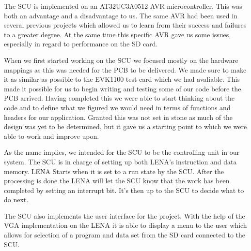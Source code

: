 The \acf{SCU} is implemented on an AT32UC3A0512 AVR microcontroller. This was both an advantage and a disadvantage to us. The same AVR had been used in several previous projects which allowed us to learn from their success and failures to a greater degree. At the same time this specific AVR gave us some issues, especially in regard to performance on the \ac{SD} card.


When we first started working on the \ac{SCU} we focused mostly on the hardware mappings as this was needed for the \ac{PCB} to be delivered. We made sure to make it as similar as possible to the EVK1100 test card which we had avaliable. This made it possible for us to begin writing and testing some of our code before the \ac{PCB} arrived. Having completed this we were able to start thinking about the code and to define what we figured we would need in terms of functions and headers for our application. Granted this was not set in stone as much of the design was yet to be determined, but it gave us a starting point to which we were able to work and improve upon.

As the name implies, we intended for the \ac{SCU} to be the controlling unit in
our system. The \ac{SCU} is in charge of setting up both \ac{LENA}'s instruction
and data memory. \ac{LENA} Starts when it is set to a run state by the
\ac{SCU}. After the processing is done the \ac{LENA} will let the \ac{SCU} know
that the work has been completed by setting an interrupt bit. It's then up to
the \ac{SCU} to decide what to do next.

The \ac{SCU} also implements the user interface for the project. With the help
of the \ac{VGA} implementation on the \ac{LENA} it is able to display a menu to
the user which allows for selection of a program and data set from the \ac{SD}
card connected to the \ac{SCU}.
